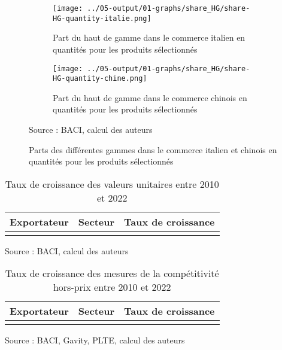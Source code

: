 \documentclass[french,10pt,a4paper]{article}
\begin{document}
\begin{figure}[!hp]
  \centering
  \begin{subfigure}{\textwidth}
    \centering    
    \texttt{[image: ../05-output/01-graphs/share\_HG/share-HG-quantity-italie.png]}
    \caption{Part du haut de gamme dans le commerce italien en quantités pour les produits sélectionnés}
    \label{fig:share-HG-quantity-italie}
  \end{subfigure}
  \vspace{0.5cm}
  \begin{subfigure}{\textwidth}
    \centering
 \texttt{[image: ../05-output/01-graphs/share\_HG/share-HG-quantity-chine.png]}
 \caption{Part du haut de gamme dans le commerce chinois en quantités pour les produits sélectionnés}
 \label{fig:share-HG-quantity-chine}
\end{subfigure}
\captionsetup{justification=raggedright,singlelinecheck=false, font=small}
  \caption*{Source : BACI, calcul des auteurs}
  \captionsetup{justification=centering, singlelinecheck=true, font=normalsize}
  \caption{Parts des différentes gammes dans le commerce italien et chinois en quantités pour les produits sélectionnés}
  \label{fig:share-HG-quantity-italie-chine}
\end{figure}


\begin{table}[!hp]
  \centering
  \begin{tabular}{lrr}
    \hline
   Exportateur & Secteur & Taux de croissance \\
    \hline
    \\
    \hline
  \end{tabular}
  \captionsetup{justification=raggedright,singlelinecheck=false, font=small}
  \caption*{Source : BACI, calcul des auteurs}
  \captionsetup{justification=centering, singlelinecheck=true, font=normalsize}
  \caption{Taux de croissance des valeurs unitaires entre 2010 et 2022}
  \label{tab:taux-croissance-uv}
\end{table}


\begin{table}[!hp]
  \centering
  \begin{tabular}{lrr}
    \hline
   Exportateur & Secteur & Taux de croissance \\
    \hline
    \\
    \hline
  \end{tabular}
  \captionsetup{justification=justified, singlelinecheck=false, font=small}
  \caption*{Source : BACI, Gavity, PLTE, calcul des auteurs}
  \captionsetup{justification=centering, singlelinecheck=true, font=normalsize}
  \caption{Taux de croissance des mesures de la compétitivité hors-prix entre 2010 et 2022}
  \label{tab:taux-croissance-hp}
\end{table}
\end{document}
